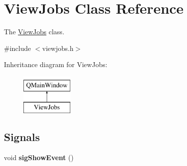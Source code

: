\hypertarget{class_view_jobs}{}\section{View\+Jobs Class Reference}
\label{class_view_jobs}


The \hyperlink{class_view_jobs}{View\+Jobs} class.  




{\ttfamily \#include $<$viewjobs.\+h$>$}

Inheritance diagram for View\+Jobs\+:\begin{figure}[H]
\begin{center}
\leavevmode
\includegraphics[height=2.000000cm]{class_view_jobs}
\end{center}
\end{figure}
\subsection*{Signals}
\begin{DoxyCompactItemize}
\item 
\mbox{\label{class_view_jobs_a6fe28a8ba9112250d4337d02e0abedbd}} 
void {\bfseries sig\+Show\+Event} ()
\end{DoxyCompactItemize}
